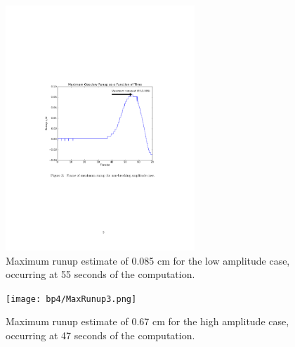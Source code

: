 \begin{figure}[ht]
\hfil\includegraphics[width=2.8in]{bp4/MaxRunup0185.pdf}\hfil
\caption{\label{MaxRunup0185} 
Maximum runup estimate of 0.085 cm for the low amplitude case, occurring at 55 seconds of the computation. 
}
\end{figure}

\begin{figure}[ht]
\hfil\texttt{[image: bp4/MaxRunup3.png]}\hfil
\caption{\label{MaxRunup3} 
Maximum runup estimate of 0.67 cm for the high amplitude case, occurring at 47 seconds of the computation. 
}
\end{figure}

